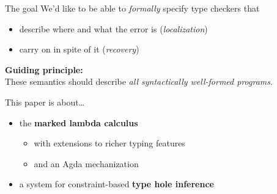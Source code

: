 \begin{frame}{The goal}
  We'd like to be able to \emph{formally} specify type checkers that \\[1em]

  \pause
  \begin{itemize}
    \item describe where and what the error is \pause (\emph{localization})
    
      \pause
    \item carry on in spite of it \pause (\emph{recovery})
  \end{itemize}

  \vspace{1em}
  \pause
  \textbf{Guiding principle:} \\
  \pause
  These semantics should describe \emph{all syntactically well-formed programs}.
\end{frame}

\begin{frame}{This paper is about\ldots}
  \begin{itemize}
    \item<+-> the \textbf{marked lambda calculus}%

      \begin{itemize}
        \item<+-> with extensions to richer typing features
        \item<+-> and an Agda mechanization
      \end{itemize}

    \item<+-> a system for constraint-based \textbf{type hole inference}
  \end{itemize}
\end{frame}
